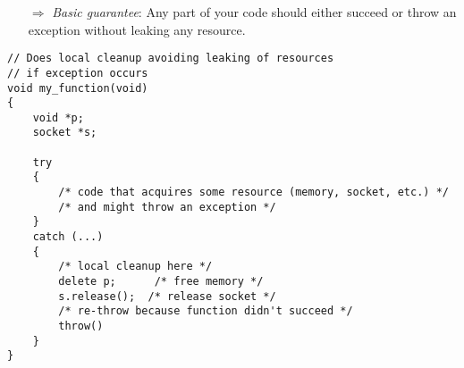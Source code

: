 \documentclass[10pt]{article}
\begin{document}
\begin{enumerate}
\item[$\Rightarrow$] \emph{Basic guarantee}: Any part of your code should either succeed or throw an exception without leaking any resource.
\end{enumerate}
\begin{lstlisting}
// Does local cleanup avoiding leaking of resources
// if exception occurs
void my_function(void)
{
    void *p;
    socket *s;
    
    try
    {
        /* code that acquires some resource (memory, socket, etc.) */
        /* and might throw an exception */
    }
    catch (...)
    { 
        /* local cleanup here */
        delete p;      /* free memory */
        s.release();  /* release socket */  
        /* re-throw because function didn't succeed */
        throw()
    }    
}
\end{lstlisting}
%
%
\end{document}
